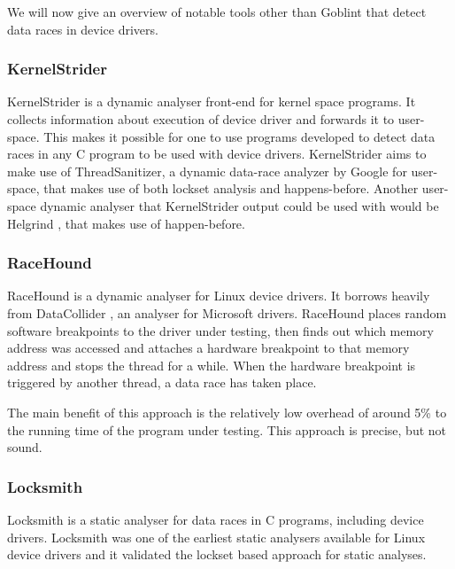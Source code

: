 \documentclass[..thesis.tex]{subfiles}
\begin{document}
We will now give an overview of notable tools other than Goblint that detect data races in device drivers.


\subsubsection{KernelStrider}

KernelStrider\cite{shatokhin_kernel} is a dynamic analyser front-end for kernel space programs. It collects information about execution of device driver and forwards it to user-space. This makes it possible for one to use programs developed to detect data races in any C program to be used with device drivers. KernelStrider aims to make use of ThreadSanitizer\cite{serebryany_threadsanitizer_2009}, a dynamic data-race analyzer by Google for user-space, that makes use of both lockset analysis and happens-before. Another user-space dynamic analyser that KernelStrider output could be used with would be Helgrind ,\cite{_helgrind,nethercote_valgrind_2007} that makes use of happen-before.


\subsubsection{RaceHound}

RaceHound\cite{komarov_implementation_2013} is a dynamic analyser for Linux device drivers. It borrows heavily from DataCollider \cite{erickson_effective_2010}, an analyser for Microsoft drivers. RaceHound places random software breakpoints to the driver under testing, then finds out which memory address was accessed and attaches a hardware breakpoint to that memory address and stops the thread for a while. When the hardware breakpoint is triggered by another thread, a data race has taken place.

The main benefit of this approach is the relatively low overhead of around 5\% to the running time of the program under testing. This approach is precise, but not sound.


\subsubsection{Locksmith}
Locksmith\cite{pratikakis_locksmith_2006} is a static analyser for data races in C programs, including device drivers. Locksmith was one of the earliest static analysers available for Linux device drivers and it validated the lockset based approach for static analyses. 
\end{document}
